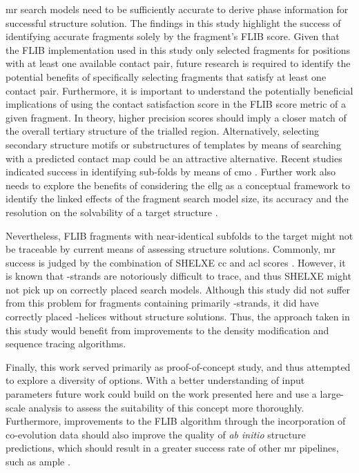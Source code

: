 \Gls{mr} search models need to be sufficiently accurate to derive phase information for successful structure solution. The findings in this study highlight the success of identifying accurate fragments solely by the fragment's FLIB score. Given that the FLIB implementation used in this study only selected fragments for positions with at least one available contact pair, future research is required to identify the potential benefits of specifically selecting fragments that satisfy at least one contact pair. Furthermore, it is important to understand the potentially beneficial implications of using the contact satisfaction score in the FLIB score metric of a given fragment. In theory, higher precision scores should imply a closer match of the overall tertiary structure of the trialled region. Alternatively, selecting secondary structure motifs or substructures of templates by means of searching with a predicted contact map could be an attractive alternative. Recent studies indicated success in identifying sub-folds by means of \gls{cmo} \cite{Buchan2017-ox,Ovchinnikov2017-nd}. Further work also needs to explore the benefits of considering the \gls{ellg} as a conceptual framework to identify the linked effects of the fragment search model size, its accuracy and the resolution on the solvability of a target structure \textcite{McCoy2017-cz}.

Nevertheless, FLIB fragments with near-identical subfolds to the target might not be traceable by current means of assessing structure solutions. Commonly, \gls{mr} success is judged by the combination of SHELXE \gls{cc} and \gls{acl} scores \cite{Thorn2013-le}. However, it is known that \textbeta-strands are notoriously difficult to trace, and thus SHELXE might not pick up on correctly placed search models. Although this study did not suffer from this problem for fragments containing primarily \textbeta-strands, it did have correctly placed \textalpha-helices without structure solutions. Thus, the approach taken in this study would benefit from improvements to the density modification and sequence tracing algorithms.

Finally, this work served primarily as proof-of-concept study, and thus attempted to explore a diversity of options. With a better understanding of input parameters future work could build on the work presented here and use a large-scale analysis to assess the suitability of this concept more thoroughly. Furthermore, improvements to the FLIB algorithm through the incorporation of co-evolution data should also improve the quality of \textit{ab initio} structure predictions, which should result in a greater success rate of other \gls{mr} pipelines, such as \gls{ample} \cite{Bibby2012-lm}.
